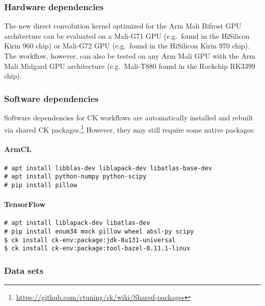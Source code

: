 \subsubsection{Hardware dependencies}

The new direct convolution kernel optimized for the Arm Mali Bifrost GPU
architecture can be evaluated on a Mali-G71 GPU (e.g.\ found in the HiSilicon
Kirin 960 chip) or Mali-G72 GPU (e.g.\ found in the HiSilicon Kirin 970 chip).
%
The workflow, however, can also be tested on any Arm Mali GPU with the Arm Mali
Midgard GPU architecture (e.g.\ Mali-T880 found in the Rockchip RK3399 chip).

\subsubsection{Software dependencies}

Software dependencies for CK workflows are automatically installed and rebuilt 
via shared CK packages.\footnote{\url{https://github.com/ctuning/ck/wiki/Shared-packages}}
However, they may still require some native packages:

\paragraph{ArmCL}

\begin{verbatim}
# apt install libblas-dev liblapack-dev libatlas-base-dev
# apt install python-numpy python-scipy
# pip install pillow
\end{verbatim}

\paragraph{TensorFlow}

\begin{verbatim}
# apt install liblapack-dev libatlas-dev
# pip install enum34 mock pillow wheel absl-py scipy
$ ck install ck-env:package:jdk-8u131-universal
$ ck install ck-env:package:tool-bazel-0.11.1-linux
\end{verbatim}

\subsubsection{Data sets}

